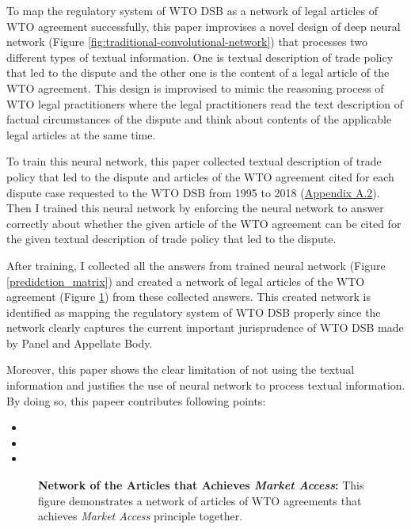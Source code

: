 To map the regulatory system of WTO DSB as 
a network of legal articles of WTO agreement 
successfully,
this paper improvises 
a novel design of deep neural network (Figure \ref{fig:traditional-convolutional-network}) that
processes two different types of textual information.
One is textual description of trade policy that led to the dispute and
the other one is the content of a legal article of the WTO agreement.
This design is improvised to mimic
the reasoning process of WTO legal practitioners
where the legal practitioners read
the text description of
factual circumstances of the dispute and think about contents of
the applicable legal articles at the same time.


To train this neural network, this paper collected textual description of trade policy 
that led to the dispute and articles of the WTO agreement cited for each dispute
case requested to the WTO DSB 
from 1995 to 2018 (\hyperref[sub:cited-articles-table]{Appendix A.2}).
Then I trained this neural network by enforcing the neural network to answer correctly 
about whether the given article of the WTO agreement
can be cited for the given textual description of 
trade policy that led to the dispute.

After training, I collected all the answers from trained neural network (Figure \ref{predidction_matrix})
and created a network of legal articles of the WTO agreement (Figure \ref{fig:market-aceess_directed}) from these collected answers.
This created network is identified as mapping the regulatory system of WTO DSB properly since the network 
clearly captures the current important jurisprudence of WTO DSB made by Panel and Appellate Body.

Moreover, this paper shows the clear limitation of not using the textual information 
and justifies the use of neural network to process textual information.
By doing so, this papeer contributes following points:
\begin{itemize}
  \item
  \item
  \item
\end{itemize}


\begin{figure}
    \centering{
      
    }
    \caption{{\bf Network of the Articles that Achieves \textit{Market Access}:} 
    This figure demonstrates a network of articles of WTO agreements
    that achieves \textit{Market Access} principle together.
    }
    \label{fig:market-aceess_directed}
  \end{figure}
  
% 

% 



